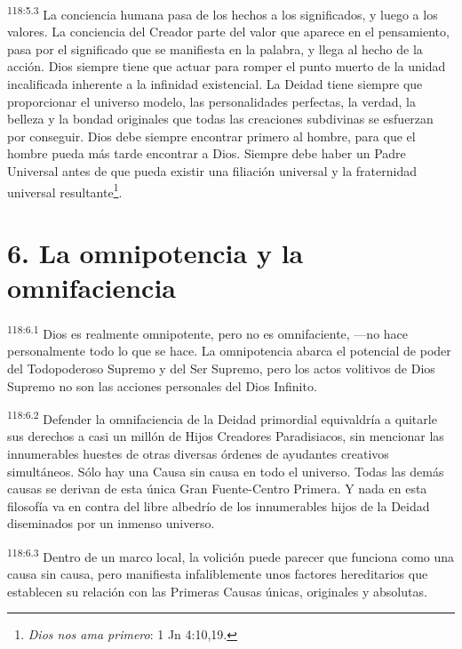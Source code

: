 \par
\textsuperscript{118:5.3} La conciencia humana pasa de los hechos a los significados, y luego a los valores. La conciencia del Creador parte del valor que aparece en el pensamiento, pasa por el significado que se manifiesta en la palabra, y llega al hecho de la acción. Dios siempre tiene que actuar para romper el punto muerto de la unidad incalificada inherente a la infinidad existencial. La Deidad tiene siempre que proporcionar el universo modelo, las personalidades perfectas, la verdad, la belleza y la bondad originales que todas las creaciones subdivinas se esfuerzan por conseguir. Dios debe siempre encontrar primero al hombre, para que el hombre pueda más tarde encontrar a Dios. Siempre debe haber un Padre Universal antes de que pueda existir una filiación universal y la fraternidad universal resultante\footnote{\textit{Dios nos ama primero}: 1 Jn 4:10,19.}.

\section*{6. La omnipotencia y la omnifaciencia}
\par
\textsuperscript{118:6.1} Dios es realmente omnipotente, pero no es omnifaciente, ---no hace personalmente todo lo que se hace. La omnipotencia abarca el potencial de poder del Todopoderoso Supremo y del Ser Supremo, pero los actos volitivos de Dios Supremo no son las acciones personales del Dios Infinito.

\par
\textsuperscript{118:6.2} Defender la omnifaciencia de la Deidad primordial equivaldría a quitarle sus derechos a casi un millón de Hijos Creadores Paradisiacos, sin mencionar las innumerables huestes de otras diversas órdenes de ayudantes creativos simultáneos. Sólo hay una Causa sin causa en todo el universo. Todas las demás causas se derivan de esta única Gran Fuente-Centro Primera. Y nada en esta filosofía va en contra del libre albedrío de los innumerables hijos de la Deidad diseminados por un inmenso universo.

\par
\textsuperscript{118:6.3} Dentro de un marco local, la volición puede parecer que funciona como una causa sin causa, pero manifiesta infaliblemente unos factores hereditarios que establecen su relación con las Primeras Causas únicas, originales y absolutas.

